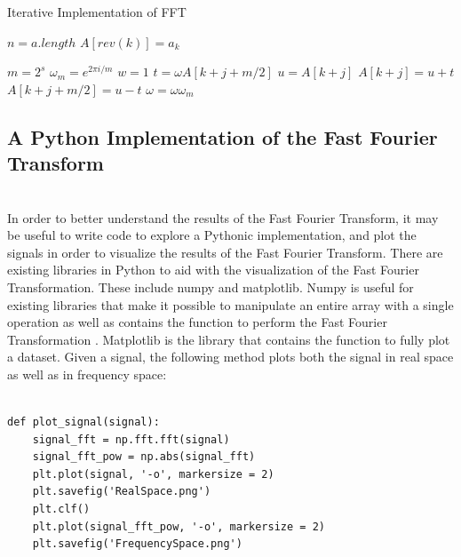 \documentclass{amsproc}
\begin{document}
\begin{algorithm}
\caption{Iterative Implementation of FFT}\label{it-fft}
\begin{algorithmic}[1]

\State $n = a.length$
	\State $A[rev(k)] = a_k$ 
\EndFor

\EndProcedure


\State {}
	\State $m = 2^s$
	\State $\omega_m = e^{2 \pi i / m}$
		\State $w = 1$
			\State $t = \omega A[k + j + m/2]$
			\State $u = A[k+j]$
			\State $A[k+j] = u + t$
			\State $A[k+j+m/2] = u - t$
			\State $\omega = \omega \omega_m$
		\EndFor
	\EndFor
\EndFor

\EndProcedure

\end{algorithmic}
\end{algorithm}

\subsection{A Python Implementation of the Fast Fourier Transform}

\mbox{}	 \\
\indent In order to better understand the results of the Fast Fourier Transform, it may be useful to write code to explore a Pythonic implementation, and  plot the signals in order to visualize the results of the Fast Fourier Transform. There are existing libraries in Python to aid with the visualization of the Fast Fourier Transformation. These include numpy and matplotlib. Numpy is useful for existing libraries that make it possible to manipulate an entire array with a single operation as well as contains the function to perform the Fast Fourier Transformation \cite{Discrete}. Matplotlib is the library that contains the function to fully plot a dataset. Given a signal, the following method plots both the signal in real space as well as in frequency space:

\begin{Verbatim}[tabsize=4]

def plot_signal(signal):
	signal_fft = np.fft.fft(signal)
	signal_fft_pow = np.abs(signal_fft)
	plt.plot(signal, '-o', markersize = 2)
	plt.savefig('RealSpace.png')
	plt.clf()
	plt.plot(signal_fft_pow, '-o', markersize = 2)
	plt.savefig('FrequencySpace.png')
	
\end{Verbatim}
\end{document}
